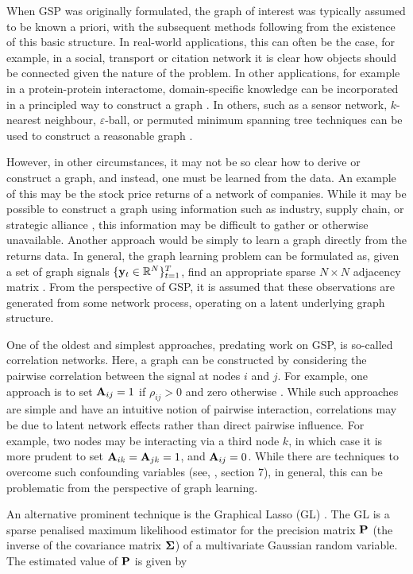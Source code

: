 When GSP was originally formulated, the graph of interest was typically assumed to be known a priori, with the subsequent methods following from the existence of this basic structure. In real-world applications, this can often be the case, for example, in a social, transport or citation network it is clear how objects should be connected given the nature of the problem. In other applications, for example in a protein-protein interactome, domain-specific knowledge can be incorporated in a principled way to construct a graph \citep{Li2023}. In others, such as a sensor network, $k$-nearest neighbour, $\varepsilon$-ball, or permuted minimum spanning tree techniques can be used to construct a reasonable graph \citep{Qiao2018}. 

However, in other circumstances, it may not be so clear how to derive or construct a graph, and instead, one must be learned from the data. An example of this may be the stock price returns of a network of companies. While it may be possible to construct a graph using information such as industry, supply chain, or strategic alliance \citep{Gao2021, Cheng2021}, this information may be difficult to gather or otherwise unavailable. Another approach would be simply to learn a graph directly from the returns data. In general, the graph learning problem can be formulated as, given a set of graph signals $\{\mathbf{y}_t \in \mathbb{R}^N\}_{t=1}^T$, find an appropriate sparse $N \times N$ adjacency matrix \citep{Dong2019}. From the perspective of GSP, it is assumed that these observations are generated from some network process, operating on a latent underlying graph structure. 

One of the oldest and simplest approaches, predating work on GSP, is so-called correlation networks. Here, a graph can be constructed by considering the pairwise correlation between the signal at nodes $i$ and $j$. For example, one approach is to set $\mathbf{A}_{ij} = 1$ if $\rho_{ij} > 0$ and zero otherwise \citep{Mateos2019}. While such approaches are simple and have an intuitive notion of pairwise interaction, correlations may be due to latent network effects rather than direct pairwise influence. For example, two nodes may be interacting via a third node $k$, in which case it is more prudent to set $\mathbf{A}_{ik} = \mathbf{A}_{jk} = 1$, and $\mathbf{A}_{ij} = 0$. While there are techniques to overcome such confounding variables (see, \cite{Kolaczyk2009}, section 7), in general, this can be problematic from the perspective of graph learning. 

An alternative prominent technique is the Graphical Lasso (GL) \citep{Friedman2007}. The GL is a sparse penalised maximum likelihood estimator for the precision matrix $\mathbf{P}$ (the inverse of the covariance matrix $\mathbf{\Sigma}$) of a multivariate Gaussian random variable. The estimated value of $\mathbf{P}$ is given by 

